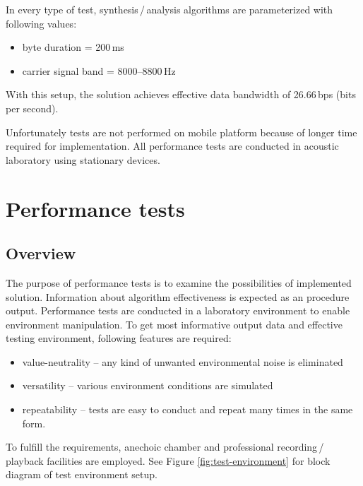 \documentclass[english,bachelor,a4paper,oneside]{ppfcmthesis}
\begin{document}
\noindent In every type of test, synthesis\,/\,analysis algorithms are parameterized with following values:

\begin{itemize}
  \item byte duration = 200\,ms
  \item carrier signal band = 8000--8800\,\mbox{Hz}
\end{itemize}

With this setup, the solution achieves effective data bandwidth of 26.66\,\mbox{bps} (bits per second).

Unfortunately tests are not performed on mobile platform because of longer time required for implementation. All performance tests 
are conducted in acoustic laboratory using stationary devices.

\section{Performance tests}
\subsection{Overview}
The purpose of performance tests is to examine the possibilities of implemented solution. Information about algorithm effectiveness is expected as an procedure output.
Performance tests are conducted in a laboratory environment to enable environment manipulation.
To get most informative output data and effective testing environment, following features are required:
\begin{itemize}
  \item value-neutrality -- any kind of unwanted environmental noise is eliminated
  \item versatility -- various environment conditions are simulated
  \item repeatability -- tests are easy to conduct and repeat many times in the same form.
\end{itemize}

To fulfill the requirements, anechoic chamber and professional recording\,/\,playback facilities are employed.
See Figure \ref{fig:test-environment} for block diagram of test environment setup.

\clearpage
\end{document}

